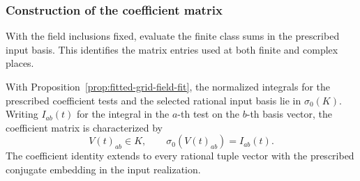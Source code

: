 \subsubsection{Construction of the coefficient matrix}

With the field inclusions fixed, evaluate the finite class sums in the prescribed input basis. This identifies the matrix entries used at both finite and complex places.

\begin{proposition}\label{prop:fitted-grid-coefficient-matrix}
With Proposition~\ref{prop:fitted-grid-field-fit}, the normalized
integrals for the prescribed coefficient tests and the selected
rational input basis lie in \(\sigma_0(K)\). Writing \(I_{ab}(t)\) for the integral in the \(a\)-th test on the \(b\)-th basis vector, the coefficient matrix is characterized by
\[
 V(t)_{ab}\in K,\qquad \sigma_0(V(t)_{ab})=I_{ab}(t).
\]
The coefficient identity extends to every rational tuple vector with the prescribed conjugate embedding in the input realization.
\end{proposition}

